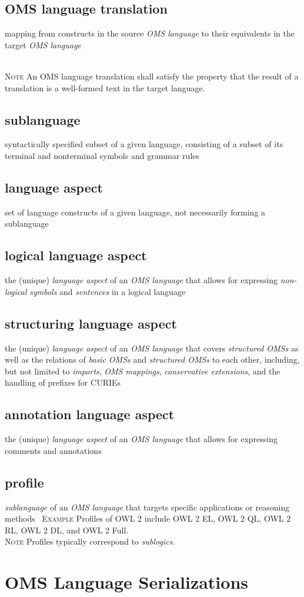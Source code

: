 \documentclass[10pt,%
\ifpretendfinal
final%
\else
draft%
\fi,
]{scrreprt}
\newcommand*{\termref}[1]{\textit{#1}}
\newcommand{\sclause}[1]{\section{#1}}
\newcommand{\termdefinition}[2]{\subsection*{#1}#2}
\newenvironment{definitions}[0]{\medskip }{}
\newenvironment{note}[0]{\ \\ \textsc{Note} \quad}{}
\newenvironment{example}[0]{\ \newline \textsc{Example}\quad }{}
\begin{document}
\begin{definitions}
  \termdefinition{OMS language translation}{mapping from constructs in the source \termref{OMS language} to their equivalents in the target \termref{OMS language}}

\begin{note}
  An OMS language translation shall satisfy the property that the
  result of a translation is a well-formed text in the target
  language.
\end{note}

  \termdefinition{sublanguage}{syntactically specified subset of a given language, consisting of a subset of its terminal and nonterminal symbols and grammar rules}

 \termdefinition{language aspect}{set of language constructs of a given language, not necessarily forming a sublanguage}

  \termdefinition{logical language aspect}{the (unique) \termref{language aspect} of an \termref{OMS language} that allows for expressing \termref{non-logical symbols} and \termref{sentences} in a logical language}

  \termdefinition{structuring language aspect}{the (unique) \termref{language aspect} of an \termref{OMS language} that covers \termref{structured OMSs} as well as the relations of \termref{basic OMSs} and \termref{structured OMSs} to each other, including, but not limited to \termref{imports}, \termref{OMS mappings}, \termref{conservative extensions}, and the handling of prefixes for CURIEs}

  \termdefinition{annotation language aspect}{the (unique) \termref{language aspect} of an \termref{OMS language} that allows for expressing comments
and annotations}

  \termdefinition{profile}{\termref{sublanguage} of an \termref{OMS language} that targets specific applications or reasoning methods}
  \begin{example}
    Profiles of OWL 2 include OWL 2 EL, OWL 2 QL, OWL 2 RL, OWL 2 DL, and OWL 2 Full.
  \end{example}
  \begin{note}
  Profiles typically correspond to \termref{sublogics}.
  \end{note}
\end{definitions}

\sclause{OMS Language Serializations}
\end{document}
